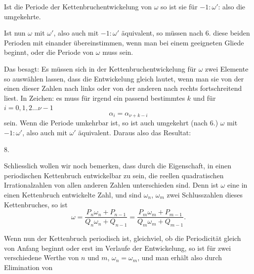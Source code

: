 Ist die Periode der Kettenbruchentwickelung von $\omega$
so ist sie für $-1 : \omega'$:
also die umgekehrte.

Ist nun $\omega$ mit $\omega'$, also auch mit $-1 : \omega'$ äquivalent, so müssen
nach 6. diese beiden Perioden mit einander übereinstimmen, wenn
man bei einem geeigneten Gliede beginnt, oder die Periode von
$\omega$ muss  sein.

Das besagt: Es müssen sich in der Kettenbruchentwickelung
für $\omega$ zwei Elemente so auswählen lassen, dass die Entwickelung
gleich lautet, wenn man sie von der einen dieser Zahlen nach
links oder von der anderen nach rechts fortschreitend liest.
In Zeichen: es muss für irgend ein passend bestimmtes $k$ und
für $i = 0, 1, 2 \ldots \nu - 1$
\[
\alpha_i = \alpha_{\nu+k-i}
\]
sein. Wenn die Periode umkehrbar ist, so ist auch umgekehrt
(nach 6.) $\omega$ mit $-1 : \omega'$, also auch mit $\omega'$ äquivalent. Daraus
also das Resultat:

8. 

Schliesslich wollen wir noch bemerken, dass durch die Eigenschaft,
in einen periodischen Kettenbruch entwickelbar zu sein,
die reellen quadratischen Irrationalzahlen von allen anderen
Zahlen unterschieden sind. Denn ist $\omega$ eine in einen Kettenbruch
 entwickelte Zahl, und sind $\omega_n$, $\omega_m$ zwei Schlusszahlen
dieses Kettenbruches, so ist
\[
\omega = \frac{P_n\omega_n + P_{n-1}}{Q_n\omega_n + Q_{n-1}} = \frac{P_m\omega_m + P_{m-1}}{Q_m\omega_m + Q_{m-1}}.
\]

Wenn nun der Kettenbruch periodisch ist, gleichviel, ob
die Periodicität gleich von Anfang beginnt oder erst im Verlaufe
der Entwickelung, so ist für zwei verschiedene Werthe von $n$
und $m$, $\omega_n = \omega_m$, und man erhält also durch Elimination von
